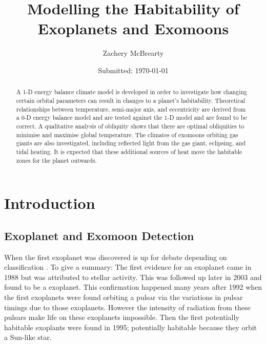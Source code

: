 \documentclass[12pt, onecolumn]{revtex4-2}    %
\begin{document}
\title{Modelling the Habitability of Exoplanets and Exomoons}
\date{Submitted: \today{}}
\author{Zachery McBrearty}

\begin{abstract}
  A 1-D energy balance climate model is developed in order to investigate how changing certain orbital parameters can result in changes to a planet's habitability.
  Theoretical relationships between temperature, semi-major axis, and eccentricity are derived from a 0-D energy balance model and are tested against the 1-D model and are found to be correct.
  A qualitative analysis of obliquity shows that there are optimal obliquities to minimise and maximise global temperature.
  The climates of exomoons orbiting gas giants are also investigated, including reflected light from the gas giant, eclipsing, and tidal heating.
  It is expected that these additional sources of heat move the habitable zones for the planet outwards.
\end{abstract}


\maketitle

\newpage

\tableofcontents

\newpage


\section{Introduction} \label{sec:Introduction} %
%
\subsection{Exoplanet and Exomoon Detection} \label{ssec:ExoplanetExomoonDetection}
%
When the first exoplanet was discovered is up for debate depending on classification \cite{ESA_2019}.
To give a summary:
The first evidence for an exoplanet came in 1988 but was attributed to stellar activity.
This was followed up later in 2003 and found to be a exoplanet.
This confirmation happened many years after 1992 when the first exoplanets were found orbiting a pulsar via the variations in pulsar timings due to those exoplanets.
However the intensity of radiation from these pulsars make life on these exoplanets impossible.
Then the first potentially habitable exoplants were found in 1995; potentially habitable because they orbit a Sun-like star.
\end{document}
